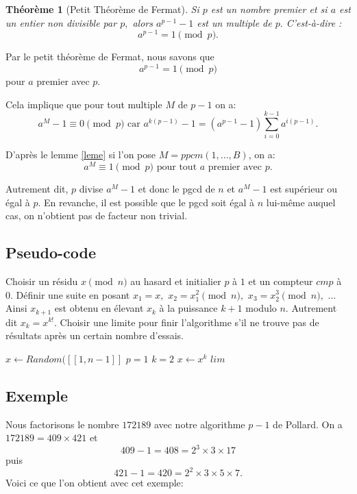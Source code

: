 \documentclass[french, 12pt, titlepage]{article}
\newtheorem{theoreme}{Th{\'e}or{\`e}me}
\begin{document}
\begin{theoreme}[Petit Théorème de Fermat]
Si $p$ est un nombre premier et si $a$ est un entier non divisible par $p,$ alors $a^{p-1} - 1$ est un multiple de $p.$ C'est-à-dire : \[a^{p-1} = 1 \pmod p .\]
\end{theoreme}
Par le petit théorème de Fermat, nous savons que \[a^{p-1} = 1 \pmod p \] pour $a$ premier avec $p.$ 

Cela implique que pour tout multiple $M$ de $p-1$ on a: \[ a^M - 1 \equiv 0 \pmod p \text{ car } a^{k(p-1)} - 1 = (a^{p-1} - 1 )\sum\limits_{i=0}^{k-1} a^{i(p-1)} . \]

D'après le lemme \ref{leme} si l'on pose $M = ppcm(1, ..., B)$, on a: \[ a^M \equiv 1 \pmod p \text{ pour tout } a \text{ premier avec } p . \]

Autrement dit, $p$ divise $a^M - 1$ et donc le pgcd de $n$ et $a^M - 1$ est supérieur ou égal à $p.$
En revanche, il est possible que le pgcd soit égal à $n$ lui-même auquel cas, on n'obtient pas de facteur non trivial.

\subsection{Pseudo-code}

Choisir un résidu $x \pmod n$ au hasard et initialier $p$ à $1$ et un compteur $cmp$ à $0.$
Définir une suite en posant $x_1 = x,$ $x_2 = x_1^2 \pmod n,$ $x_3 = x_2^3 \pmod n,$ ... Ainsi $x_ {k+1}$ est obtenu en élevant $x_k$ à la puissance $k+1$ modulo $n.$ Autrement dit $x_k = x^{k!}.$
Choisir une limite pour finir l'algorithme s'il ne trouve pas de résultats après un certain nombre d'essais.

\begin{algorithm}
\caption{Factorisation de $n$ par $p-1$ de Pollard}
\BlankLine
$x \gets Random([\![1,n-1]\!]$\;
$p = 1$\;
$k = 2$\;
$x \gets x^k$\;
$lim$\;
\end{algorithm}

\subsection{Exemple}

Nous factorisons le nombre $172189$ avec notre algorithme $p-1$ de Pollard.
On a $172189 = 409 \times 421$ et \[409 - 1 = 408 = 2^3 \times 3 \times 17 \] puis \[421-1 = 420 = 2^2 \times 3 \times 5 \times 7.\] 
Voici ce que l'on obtient avec cet exemple:
\end{document}
